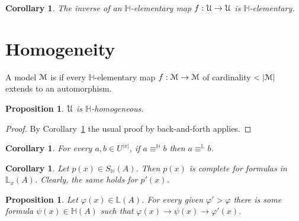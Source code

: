 \documentclass[11pt,oneside]{amsart}
\theoremstyle{plain}
\newtheorem{proposition}[theorem]{Proposition}
\newtheorem{corollary}[theorem]{Corollary}
\theoremstyle{remark}
\renewcommand*{\emph}[1]{%
   \smash{\tikz[baseline]\node[rectangle, fill=olive!25, rounded corners, inner xsep=0.5ex, inner ysep=0.2ex, anchor=base, minimum height = 2.7ex]{#1};}}
\begin{document}
\begin{corollary}\label{corol_Hcomplete3}
  The inverse of an $\mathds{H}$-elementary map $f:{\EuScript U}\to{\EuScript U}$ is $\mathds{H}$-elementary.\hfill\qedsymbol
\end{corollary}






\section{Homogeneity}

A model ${\EuScript M}$ is \emph{$\mathds{H}$-homogeneous\/} if every $\mathds{H}$-elementary map $f:{\EuScript M}\to{\EuScript M}$ of cardinality $<|{\EuScript M}|$ extends to an automorphism.

\begin{proposition}
  ${\EuScript U}$ is $\mathds{H}$-homogeneous.
\end{proposition}

\begin{proof}
  By Corollary~\ref{corol_Hcomplete3} the usual proof by back-and-forth applies.
\end{proof}

\begin{corollary}\label{corol_H=L}
  For every $a,b\in U^{|x|}$, if $a\equiv^\mathds{H}b$ then  $a\equiv^\mathds{L}b$.\hfill\qedsymbol
\end{corollary}

\begin{corollary}\label{corol_Lcomplete}
  Let $p(x)\in S_\mathds{H}(A)$.
  Then $p(x)$ is complete for formulas in $\mathds{L}_x(A)$.
  Clearly, the same holds for $p'(x)$.\hfill\qedsymbol
\end{corollary}

\begin{proposition}\label{prop_LHapprox1}
  Let $\varphi(x)\in\mathds{L}(A)$.
  For every given $\varphi'>\varphi$ there is some formula $\psi(x)\in\mathds{H}(A)$ such that $\varphi(x)\rightarrow\psi(x)\rightarrow\varphi'(x)$.
\end{proposition}
\end{document}
